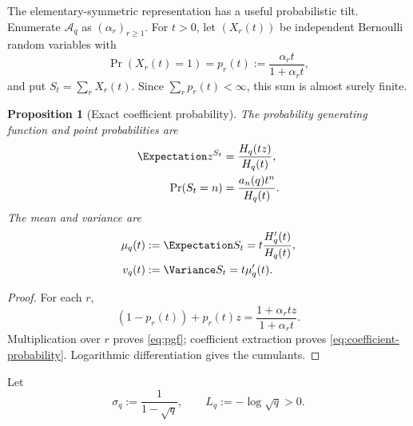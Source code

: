 \documentclass[11pt]{article}
\numberwithin{equation}{section}
\newtheorem{proposition}[theorem]{Proposition}
\theoremstyle{definition}
\theoremstyle{remark}
\begin{document}
The elementary-symmetric representation has a useful probabilistic tilt.  Enumerate $\mathcal A_q$ as $(\alpha_r)_{r\ge1}$.  For $t>0$, let $(X_r(t))$ be independent Bernoulli random variables with
\begin{equation}\label{eq:bernoulli-p}
 \Pr(X_r(t)=1)=p_r(t):=\frac{\alpha_rt}{1+\alpha_rt},
\end{equation}
and put $S_t=\sum_rX_r(t)$.  Since $\sum_rp_r(t)<\infty$, this sum is almost surely finite.

\begin{proposition}[Exact coefficient probability]\label{prop:probability}
The probability generating function and point probabilities are
\begin{align}
 \Expectation z^{S_t}&=\frac{H_q(tz)}{H_q(t)},\label{eq:pgf}\\
 \Pr(S_t=n)&=\frac{a_n(q)t^n}{H_q(t)}.
 \label{eq:coefficient-probability}
\end{align}
The mean and variance are
\begin{align}
 \mu_q(t)&:=\Expectation S_t=t\frac{H_q'(t)}{H_q(t)},\label{eq:mu}\\
 v_q(t)&:=\Variance S_t=t\mu_q'(t).
 \label{eq:variance}
\end{align}
\end{proposition}
\begin{proof}
For each $r$,
\[
 (1-p_r(t))+p_r(t)z=\frac{1+\alpha_rtz}{1+\alpha_rt}.
\]
Multiplication over $r$ proves \eqref{eq:pgf}; coefficient extraction proves \eqref{eq:coefficient-probability}.  Logarithmic differentiation gives the cumulants.
\end{proof}

Let
\begin{equation}\label{eq:sigma-L}
 \sigma_q:=\frac1{1-\sqrt q},\qquad L_q:=-\log\sqrt q>0.
\end{equation}
\end{document}
